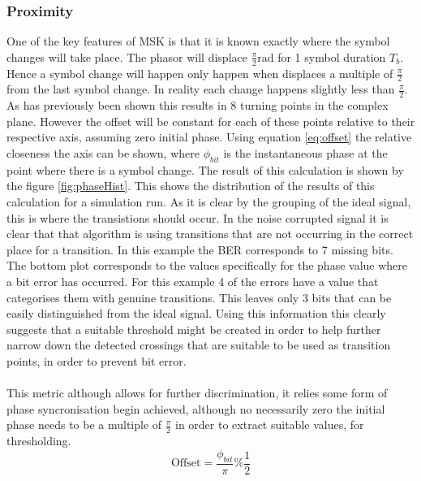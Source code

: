\subsubsection{Proximity}
One of the key features of MSK is that it is known exactly where the symbol changes will take place. The phasor will displace $\frac{\pi}{2}\si{\radian}$ for 1 symbol duration $T_b$. Hence a symbol change will happen only happen when displaces a multiple of $\frac{\pi}{2}$ from the last symbol change. In reality each change happens slightly less than $\frac{\pi}{2}$. As has previously been shown this results in 8 turning points in the complex plane. However the offset will be constant for each of these points relative to their respective axis, assuming zero initial phase. Using equation \ref{eq:offset} the relative closeness the axis can be shown, where $\phi_{bit}$ is the instantaneous phase at the point where there is a symbol change. The result of this calculation is shown by the figure \ref{fig:phaseHist}. This shows the distribution of the results of this calculation for a simulation run. As it is clear by the grouping of the ideal signal, this is where the transistions should occur. In the noise corrupted signal it is clear that that algorithm is using transitions that are not occurring in the correct place for a transition. In this example the BER corresponds to 7 missing bits. The bottom plot corresponds to the values specifically for the phase value where a bit error has occurred. For this example 4 of the errors have a value that categorises them with genuine transitions. This leaves only 3 bits that can be easily distinguished from the ideal signal. Using this information this clearly suggests that a suitable threshold might be created in order to help further narrow down the detected crossings that are suitable to be used as transition points, in order to prevent bit error.
\\\\
This metric although allows for further discrimination, it relies some form of phase syncronisation begin achieved, although no necessarily zero the initial phase needs to be a multiple of $\frac{\pi}{2}$ in order to extract suitable values, for thresholding. 
\begin{equation}
    \text{Offset} = \frac{\phi_{bit}}{\pi} \% \frac{1}{2}
    \label{eq:offset}
\end{equation}

